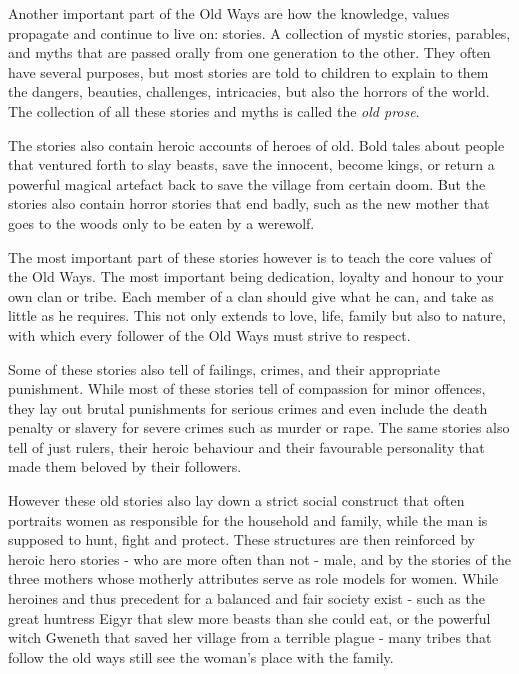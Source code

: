 
Another important part of the Old Ways are how the knowledge, values propagate
and continue to live on: stories. A collection of mystic stories, parables,
and myths that are passed orally from one generation to the other. They often
have several purposes, but most stories are told to children to explain to
them the dangers, beauties, challenges, intricacies, but also the horrors of
the world. The collection of all these stories and myths is called the
\emph{old prose}.

The stories also contain heroic accounts of heroes of old. Bold tales about
people that ventured forth to slay beasts, save the innocent, become kings, or
return a powerful magical artefact back to save the village from certain doom.
But the stories also contain horror stories that end badly, such as the new
mother that goes to the woods only to be eaten by a werewolf.

The most important part of these stories however is to teach the core values of
the Old Ways. The most important being dedication, loyalty and honour to your
own clan or tribe. Each member of a clan should give what he can, and take as
little as he requires. This not only extends to love, life, family but also
to nature, with which every follower of the Old Ways must strive to respect.

Some of these stories also tell of failings, crimes, and their appropriate
punishment. While most of these stories tell of compassion for minor offences,
they lay out brutal punishments for serious crimes and even include the death
penalty or slavery for severe crimes such as murder or rape. The same stories
also tell of just rulers, their heroic behaviour and their favourable
personality that made them beloved by their followers.

However these old stories also lay down a strict social construct that often
portraits women as responsible for the household and family, while the man is
supposed to hunt, fight and protect. These structures are then reinforced by
heroic hero stories - who are more often than not - male, and by the stories
of the three mothers whose motherly attributes serve as role models for women.
While heroines and thus precedent for a balanced and fair society exist - such
as the great huntress Eigyr that slew more beasts than she could eat, or the
powerful witch Gweneth that saved her village from a terrible plague - many
tribes that follow the old ways still see the woman's place with the family.

